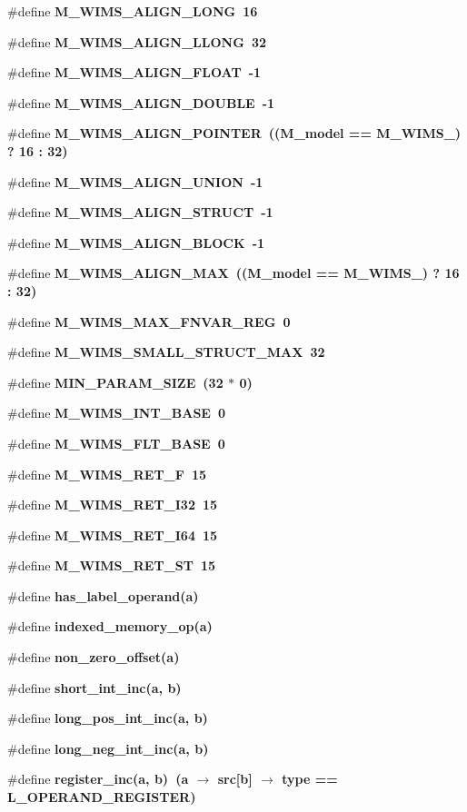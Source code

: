\begin{CompactItemize}
\#define \bf{M\_\-WIMS\_\-ALIGN\_\-LONG}~16
\item 
\#define \bf{M\_\-WIMS\_\-ALIGN\_\-LLONG}~32
\item 
\#define \bf{M\_\-WIMS\_\-ALIGN\_\-FLOAT}~-1
\item 
\#define \bf{M\_\-WIMS\_\-ALIGN\_\-DOUBLE}~-1
\item 
\#define \bf{M\_\-WIMS\_\-ALIGN\_\-POINTER}~((\bf{M\_\-model} == M\_\-WIMS\_) ? 16 : 32)
\item 
\#define \bf{M\_\-WIMS\_\-ALIGN\_\-UNION}~-1
\item 
\#define \bf{M\_\-WIMS\_\-ALIGN\_\-STRUCT}~-1
\item 
\#define \bf{M\_\-WIMS\_\-ALIGN\_\-BLOCK}~-1
\item 
\#define \bf{M\_\-WIMS\_\-ALIGN\_\-MAX}~((\bf{M\_\-model} == M\_\-WIMS\_) ? 16 : 32)
\item 
\#define \bf{M\_\-WIMS\_\-MAX\_\-FNVAR\_\-REG}~0
\item 
\#define \bf{M\_\-WIMS\_\-SMALL\_\-STRUCT\_\-MAX}~32
\item 
\#define \bf{MIN\_\-PARAM\_\-SIZE}~(32 $\ast$ 0)
\item 
\#define \bf{M\_\-WIMS\_\-INT\_\-BASE}~0
\item 
\#define \bf{M\_\-WIMS\_\-FLT\_\-BASE}~0
\item 
\#define \bf{M\_\-WIMS\_\-RET\_\-F}~15
\item 
\#define \bf{M\_\-WIMS\_\-RET\_\-I32}~15
\item 
\#define \bf{M\_\-WIMS\_\-RET\_\-I64}~15
\item 
\#define \bf{M\_\-WIMS\_\-RET\_\-ST}~15
\item 
\#define \bf{has\_\-label\_\-operand}(a)
\item 
\#define \bf{indexed\_\-memory\_\-op}(a)
\item 
\#define \bf{non\_\-zero\_\-offset}(a)
\item 
\#define \bf{short\_\-int\_\-inc}(a, b)
\item 
\#define \bf{long\_\-pos\_\-int\_\-inc}(a, b)
\item 
\#define \bf{long\_\-neg\_\-int\_\-inc}(a, b)
\item 
\#define \bf{register\_\-inc}(a, b)~(a $\rightarrow$ src[b] $\rightarrow$ type == L\_\-OPERAND\_\-REGISTER)
\end{CompactItemize}
